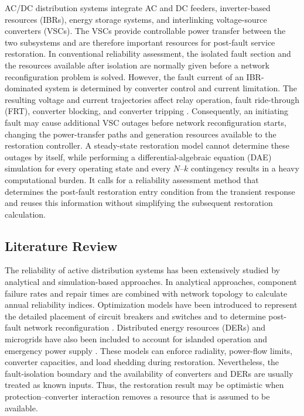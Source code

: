 \documentclass[journal]{IEEEtran}
\begin{document}
 AC/DC distribution systems integrate AC and DC feeders,
inverter-based resources (IBRs), energy storage systems, and interlinking
voltage-source converters (VSCs). The VSCs provide controllable power transfer
between the two subsystems and are therefore important resources for post-fault
service restoration. In conventional reliability assessment, the isolated
fault section and the resources available after isolation are normally given
before a network reconfiguration problem is solved. However, the fault current
of an IBR-dominated system is determined by converter control and current
limitation. The resulting voltage and current trajectories affect relay
operation, fault ride-through (FRT), converter blocking, and converter tripping
\cite{baeckeland2022stationary,azizi2024gridcode,fan2023faultrecovery,
cisneros2024protection}. Consequently, an initiating fault may cause additional
VSC outages before network reconfiguration starts, changing the power-transfer
paths and generation resources available to the restoration controller. A
steady-state restoration model cannot determine these outages by itself, while
performing a differential-algebraic equation (DAE) simulation for every
operating state and every $N$--$k$ contingency results in a heavy computational
burden. It calls for a reliability assessment method that determines the
post-fault restoration entry condition from the transient response and reuses
this information without simplifying the subsequent restoration calculation.

\subsection{Literature Review}

The reliability of active distribution systems has been extensively studied by
analytical and simulation-based approaches. In analytical approaches,
component failure rates and repair times are combined with network topology to
calculate annual reliability indices. Optimization models have been introduced
to represent the detailed placement of circuit breakers and switches and to
determine post-fault network reconfiguration \cite{li2020switchplacement,
li2020reconfiguration}. Distributed energy resources (DERs) and microgrids have
also been included to account for islanded operation and emergency power supply
\cite{karngala2021der}. These models can enforce radiality, power-flow limits,
converter capacities, and load shedding during restoration. Nevertheless, the
fault-isolation boundary and the availability of converters and DERs are
usually treated as known inputs. Thus, the restoration result may be optimistic
when protection--converter interaction removes a resource that is assumed to be
available.
\end{document}
